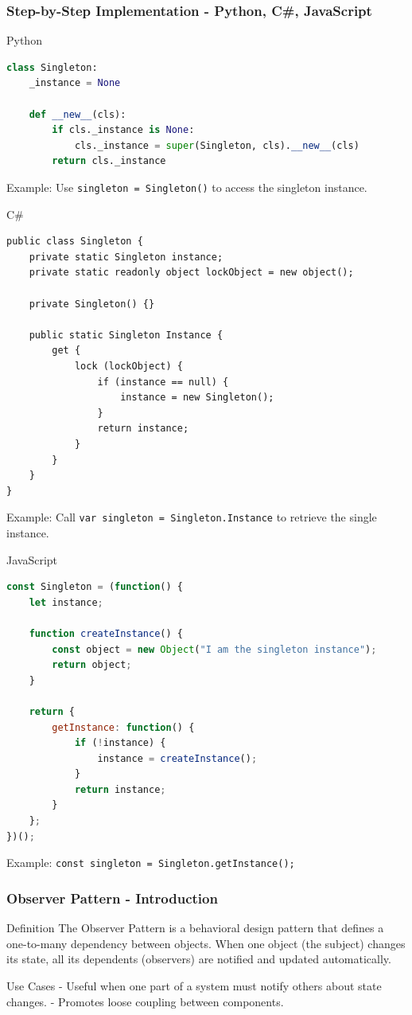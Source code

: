 \documentclass{beamer}
\begin{document}
\begin{frame}[fragile]
    \frametitle{Step-by-Step Implementation - Python, C\#, JavaScript}
    \begin{block}{Python}
    \begin{lstlisting}[language=Python]
class Singleton:
    _instance = None

    def __new__(cls):
        if cls._instance is None:
            cls._instance = super(Singleton, cls).__new__(cls)
        return cls._instance
    \end{lstlisting}
    \end{block}
    Example: Use \texttt{singleton = Singleton()} to access the singleton instance.

    \begin{block}{C\#}
    \begin{lstlisting}[language=CSharp]
public class Singleton {
    private static Singleton instance;
    private static readonly object lockObject = new object();

    private Singleton() {}

    public static Singleton Instance {
        get {
            lock (lockObject) {
                if (instance == null) {
                    instance = new Singleton();
                }
                return instance;
            }
        }
    }
}
    \end{lstlisting}
    \end{block}
   Example: Call \texttt{var singleton = Singleton.Instance} to retrieve the single instance.

   \begin{block}{JavaScript}
   \begin{lstlisting}[language=JavaScript]
const Singleton = (function() {
    let instance;

    function createInstance() {
        const object = new Object("I am the singleton instance");
        return object;
    }

    return {
        getInstance: function() {
            if (!instance) {
                instance = createInstance();
            }
            return instance;
        }
    };
})();
   \end{lstlisting}
   \end{block}
   Example: \texttt{const singleton = Singleton.getInstance();}
\end{frame}

\begin{frame}[fragile]
    \frametitle{Observer Pattern - Introduction}
    \begin{block}{Definition}
        The Observer Pattern is a behavioral design pattern that defines a one-to-many dependency between objects. When one object (the subject) changes its state, all its dependents (observers) are notified and updated automatically.
    \end{block}
    \begin{block}{Use Cases}
        - Useful when one part of a system must notify others about state changes.
        - Promotes loose coupling between components.
    \end{block}
\end{frame}
\end{document}
